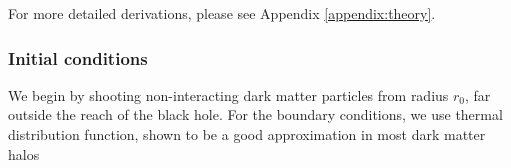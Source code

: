 \documentclass[12pt]{article}
\begin{document}
% 
% 
% 



% 
% 
% 
% 
% 
% 
% 

For more detailed derivations, please see Appendix \ref{appendix:theory}.

\subsubsection{Initial conditions}


We begin by shooting non-interacting dark matter particles from radius $r_0$, far outside the reach of the black hole. 
For the boundary conditions, we use thermal distribution function, shown to be a good approximation in most 
dark matter halos


% 
% 
\end{document}
